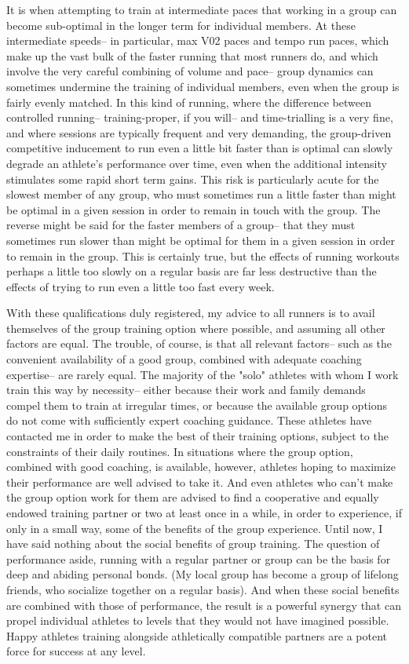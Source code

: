 It is when attempting to train at intermediate paces that working in a group can become sub-optimal in the longer term for individual members. At these intermediate speeds-- in particular, max V02 paces and tempo run paces, which make up the vast bulk of the faster running that most runners do, and which involve the very careful combining of volume and pace-- group dynamics can sometimes undermine the training of individual members, even when the group is fairly evenly matched. In this kind of running, where the difference between controlled running-- training-proper, if you will-- and time-trialling is a very fine, and where sessions are typically frequent and very demanding, the group-driven competitive inducement to run even a little bit faster than is optimal can slowly degrade an athlete's performance over time, even when the additional intensity stimulates some rapid short term gains. This risk is particularly acute for the slowest member of any group, who must sometimes run a little faster than might be optimal in a given session in order to remain in touch with the group. The reverse might be said for the faster members of a group-- that they must sometimes run slower than might be optimal for them in a given session in order to remain in the group. This is certainly true, but the effects of running workouts perhaps a little too slowly on a regular basis are far less destructive than the effects of trying to run even a little too fast every week.

With these qualifications duly registered, my advice to all runners is to avail themselves of the group training option where possible, and assuming all other factors are equal. The trouble, of course, is that all relevant factors-- such as the convenient availability of a good group, combined with adequate coaching expertise-- are rarely equal. The majority of the "solo" athletes with whom I work train this way by necessity-- either because their work and family demands compel them to train at irregular times, or because the available group options do not come with sufficiently expert coaching guidance. These athletes have contacted me in order to make the best of their training options, subject to the constraints of their daily routines. In situations where the group option, combined with good coaching, is available, however, athletes hoping to maximize their performance are well advised to take it. And even athletes who can't make the group option work for them are advised to find a cooperative and equally endowed training partner or two at least once in a while, in order to experience, if only in a small way, some of the benefits of the group experience. Until now, I have said nothing about the social benefits of group training. The question of performance aside, running with a regular partner or group can be the basis for deep and abiding personal bonds. (My local group has become a group of lifelong friends, who socialize together on a regular basis). And when these social benefits are combined with those of performance, the result is a powerful synergy that can propel individual athletes to levels that they would not have imagined possible. Happy athletes training alongside athletically compatible partners are a potent force for success at any level.

